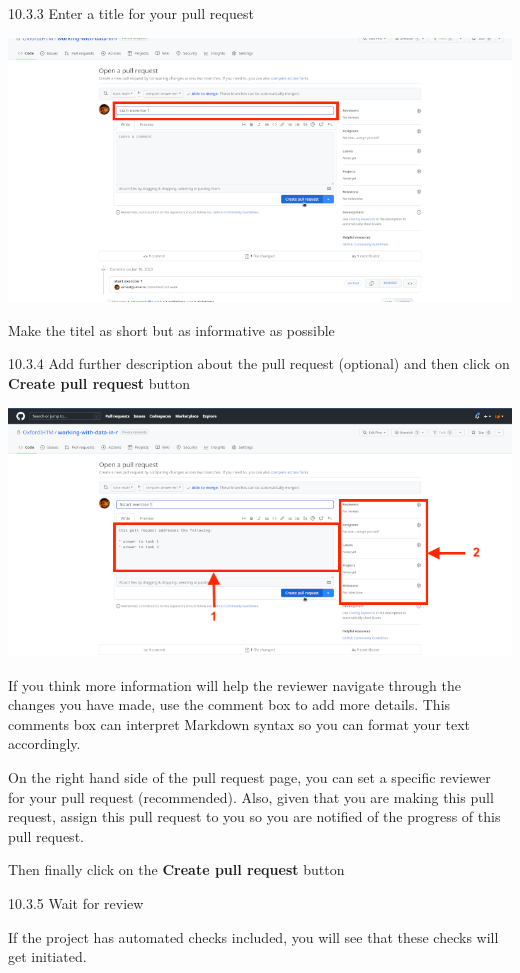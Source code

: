 \documentclass[
  12pt,
]{book}
\begin{document}
10.3.3 Enter a title for your pull request

\includegraphics{images/pull_request3.png}

Make the titel as short but as informative as possible

10.3.4 Add further description about the pull request (optional) and then click on \textbf{Create pull request} button

\includegraphics{images/pull_request4.png}

If you think more information will help the reviewer navigate through the changes you have made, use the comment box to add more details. This comments box can interpret Markdown syntax so you can format your text accordingly.

On the right hand side of the pull request page, you can set a specific reviewer for your pull request (recommended). Also, given that you are making this pull request, assign this pull request to you so you are notified of the progress of this pull request.

Then finally click on the \textbf{Create pull request} button

10.3.5 Wait for review

If the project has automated checks included, you will see that these checks will get initiated.
\end{document}
